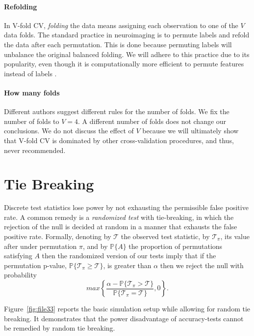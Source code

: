 \documentclass[oupdraft]{bio}
\begin{document}
\paragraph{Refolding}
In V-fold CV, \emph{folding} the data means assigning each observation to one of the $V$ data folds. 
The standard practice in neuroimaging is to permute labels and refold the data after each permutation. 
This is done because permuting labels will unbalance the original balanced folding.
We will adhere to this practice due to its popularity, even though it is computationally more efficient to permute features instead of labels \citep[e.g.][]{golland_permutation_2005} .


\paragraph{How many folds}
Different authors suggest different rules for the number of folds. 
We fix the number of folds to $V=4$.
A different number of folds does not change our conclusions. 
We do not discuss the effect of $V$ because we will ultimately show that V-fold CV is dominated by other cross-validation procedures, and thus, never recommended. 




\section{Tie Breaking}
\label{sec:ties}

Discrete test statistics lose power by not exhausting the permissible false positive rate. 
A common remedy is a \emph{randomized test} with tie-breaking, in which the rejection of the null is decided at random in a manner that exhausts the false positive rate. 
Formally, denoting by $\mathcal{T}$ the observed test statistic, by $\mathcal{T}_\pi$, its value after under permutation $\pi$, and by $\mathbb{P}\{A\}$ the proportion of permutations satisfying $A$ then the randomized version of our tests imply that if the permutation p-value, 
$\mathbb{P}\{\mathcal{T}_\pi \geq \mathcal{T}\}$, 
is greater than  $\alpha$ then we reject the null with probability 
$$ max\left\{\frac{\alpha - \mathbb{P}\{\mathcal{T}_\pi > \mathcal{T}\}}{\mathbb{P}\{\mathcal{T}_\pi = \mathcal{T}\}},0 \right\}.$$

Figure~\ref{fig:file33} reports the basic simulation setup while allowing for random tie breaking. 
It demonstrates that the power disadvantage of accuracy-tests cannot be remedied by random tie breaking.
\end{document}
